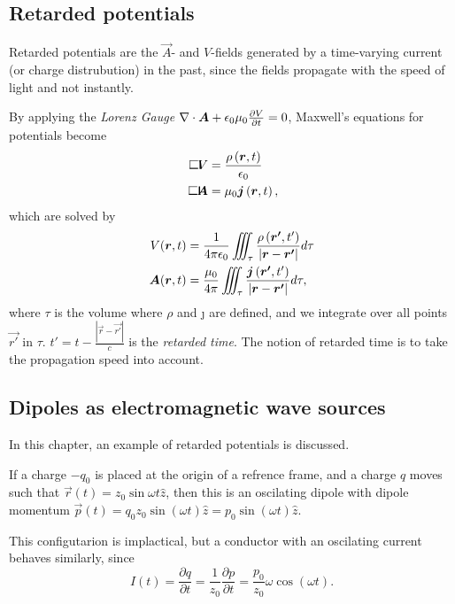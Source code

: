 \subsection{Retarded potentials}
    Retarded potentials are the $\vec{A}$- and $V$-fields generated by a time-varying current (or charge distrubution) in the past, 
    since the fields propagate with the speed of light and not instantly. 
    
    By applying the \textit{Lorenz Gauge} $\nabla\cdot\bm{A} + \epsilon_0\mu_0\frac{\partial V}{\partial t} = 0$, 
    Maxwell's equations for potentials become
    \begin{align}
        \dalambert V &= \frac{\rho\left(\vec{r}, t\right)}{\e} \\
        \dalambert \vec{A} &= \mu_0 \j\left(\vec{r}, t\right),
    \end{align}
    which are solved by 
    \begin{align} 
        V(\bm{r}, t) &= \frac{1}{4\pi\epsilon_0} \iiint_\tau \frac{\rho\left(\bm{r'}, t'\right)}{|\bm{r} - \bm{r'}|}d\tau \\
        \bm{A}(\bm{r}, t) &= \frac{\mu_0}{4\pi} \iiint_\tau \frac{\bm{j}\left(\bm{r'}, t'\right)}{|\bm{r} - \bm{r'}|}d\tau,
        \label{retarded potentials}
    \end{align}
    where $\tau$ is the volume where $\rho$ and \j{} are defined, 
    and we integrate over all points $\vec{r'}$ in $\tau$.
    $t' = t - \frac{|\vec{r} - \vec{r'}|}{c}$ is the \textit{retarded time}. 
    The notion of retarded time is to take the propagation speed into account.

\subsection{Dipoles as electromagnetic wave sources}
    In this chapter, an example of retarded potentials is discussed. 

    If a charge $-q_0$ is placed at the origin of a refrence frame, 
    and a charge $q$ moves such that $\vec{r}(t) = z_0 \sin\omega t \hat{z}$, 
    then this is an oscilating dipole with dipole momentum 
    $\vec{p}\left(t\right) = q_0 z_0 \sin\left(\omega t\right)\hat{z} = p_0 \sin\left(\omega t\right)\hat{z}$.

    This configutarion is implactical, but a conductor with an oscilating current behaves similarly, since
    \begin{equation*}
        I(t) = \frac{\partial q}{\partial t} = \frac{1}{z_0} \frac{\partial p}{\partial t} = \frac{p_0}{z_0}\omega\cos\left(\omega t\right).
    \end{equation*}
    
